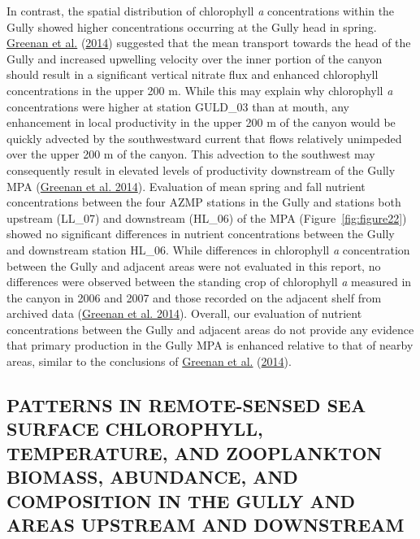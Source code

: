 \documentclass[12pt]{article}\usepackage[]{graphicx}\usepackage[]{color}
\begin{document}
In contrast, the spatial distribution of chlorophyll \emph{a} concentrations within the Gully showed higher concentrations occurring at the Gully head in spring. \protect\hyperlink{ref-greenan_2014}{Greenan et al.} (\protect\hyperlink{ref-greenan_2014}{2014}) suggested that the mean transport towards the head of the Gully and increased upwelling velocity over the inner portion of the canyon should result in a significant vertical nitrate flux and enhanced chlorophyll concentrations in the upper 200 m. While this may explain why chlorophyll \emph{a} concentrations were higher at station GULD\_03 than at mouth, any enhancement in local productivity in the upper 200 m of the canyon would be quickly advected by the southwestward current that flows relatively unimpeded over the upper 200 m of the canyon. This advection to the southwest may consequently result in elevated levels of productivity downstream of the Gully MPA (\protect\hyperlink{ref-greenan_2014}{Greenan et al. 2014}). Evaluation of mean spring and fall nutrient concentrations between the four AZMP stations in the Gully and stations both upstream (LL\_07) and downstream (HL\_06) of the MPA (Figure~\ref{fig:figure22}) showed no significant differences in nutrient concentrations between the Gully and downstream station HL\_06. While differences in chlorophyll \emph{a} concentration between the Gully and adjacent areas were not evaluated in this report, no differences were observed between the standing crop of chlorophyll \emph{a} measured in the canyon in 2006 and 2007 and those recorded on the adjacent shelf from archived data (\protect\hyperlink{ref-greenan_2014}{Greenan et al. 2014}). Overall, our evaluation of nutrient concentrations between the Gully and adjacent areas do not provide any evidence that primary production in the Gully MPA is enhanced relative to that of nearby areas, similar to the conclusions of \protect\hyperlink{ref-greenan_2014}{Greenan et al.} (\protect\hyperlink{ref-greenan_2014}{2014}).

\hypertarget{patterns-in-remote-sensed-sea-surface-chlorophyll-temperature-and-zooplankton-biomass-abundance-and-composition-in-the-gully-and-areas-upstream-and-downstream}{%
\subsection{\texorpdfstring{\textbf{PATTERNS IN REMOTE-SENSED SEA SURFACE CHLOROPHYLL, TEMPERATURE, AND ZOOPLANKTON BIOMASS, ABUNDANCE, AND COMPOSITION IN THE GULLY AND AREAS UPSTREAM AND DOWNSTREAM}}{PATTERNS IN REMOTE-SENSED SEA SURFACE CHLOROPHYLL, TEMPERATURE, AND ZOOPLANKTON BIOMASS, ABUNDANCE, AND COMPOSITION IN THE GULLY AND AREAS UPSTREAM AND DOWNSTREAM}}\label{patterns-in-remote-sensed-sea-surface-chlorophyll-temperature-and-zooplankton-biomass-abundance-and-composition-in-the-gully-and-areas-upstream-and-downstream}}
\end{document}
